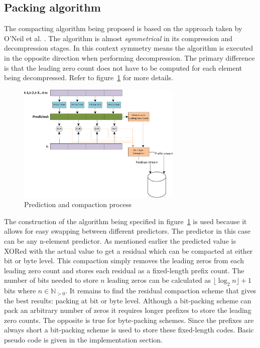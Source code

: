 \subsection{Packing algorithm}
The compacting algorithm being proposed is based on the approach taken by O'Neil et al. \cite{O'Neil:2011:FDC:1964179.1964189}. The algorithm is almost \textit{symmetrical} in its compression and 
decompression stages. In this context symmetry means the algorithm is executed in the opposite direction when performing decompression. The primary difference is that the leading 
zero count does not have to be computed for each element being decompressed. Refer to figure~\ref{PACKING_ALGORITHM} for more details.
\begin{figure}[h!]
 \centering
 \includegraphics[width=0.7\textwidth]{Thesis_Alg.png}
 \caption{Prediction and compaction process}
 \label{PACKING_ALGORITHM}
\end{figure}
The construction of the algorithm being specified in figure~\ref{PACKING_ALGORITHM} is used because it allows for easy swapping between different predictors. The predictor in this case 
can be any n-element predictor. As mentioned earlier the predicted value is XORed with the actual value to get a residual which can be compacted at either bit or byte level. This 
compaction simply removes the leading zeros from each leading zero count and stores each residual as a fixed-length prefix count. The number of bits needed to store $n$ leading 
zeros can be calculated as $\lfloor\log_2n\rfloor+1$ bits where $n\in\mathbb{N}_{>0}$. It remains to find the residual compaction scheme that gives the best results: packing at 
bit or byte level. Although a bit-packing scheme can pack an arbitrary number of zeros it requires longer prefixes to store the leading zero counts. The opposite is true 
for byte-packing schemes. Since the prefixes are always short a bit-packing scheme is used to store these fixed-length codes. Basic pseudo code is given in the implementation section.

